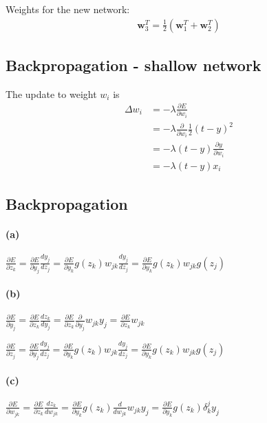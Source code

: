 \documentclass[a4paper,11pt]{article}
\begin{document}
	\noindent Weights for the new network:
	\begin{align*}
		\bm{w}_3^T=\frac{1}{2}(\bm{w}_1^T+\bm{w}_2^T)
	\end{align*}

	\subsection{Backpropagation - shallow network}
	The update to weight $w_i$ is
	\begin{align*}
		\Delta w_i &= -\lambda\frac{\partial E}{\partial w_i} \\
		&= -\lambda \frac{\partial}{\partial w_i}\frac{1}{2}(t-y)^2\\
		&= -\lambda (t-y)\frac{\partial y}{\partial w_i}\\
		&= -\lambda (t-y)x_i
	\end{align*}

	\subsection{Backpropagation}
	\paragraph{(a)}
	$\frac{\partial E}{\partial z_k} =\frac{\partial E}{\partial y_j} \frac{dy_j}{dz_j} = \frac{\partial E}{\partial y_k} g(z_k) w_{jk} \frac{dy_j}{dz_j} = \frac{\partial E}{\partial y_k} g(z_k) w_{jk} g(z_j)$
	\paragraph{(b)}
	$\frac{\partial E}{\partial y_j} =\frac{\partial E}{\partial z_k} \frac{dz_k}{dy_j} =
	\frac{\partial E}{\partial z_k} \frac{\partial}{\partial y_j} w_{jk} y_j =\frac{\partial E}{\partial z_k} w_{jk}$\par
	\setlength\parindent{1cm} $\frac{\partial E}{\partial z_j} = \frac{\partial E}{\partial y_j} \frac{dy_j}{dz_j} = \frac{\partial E}{\partial y_k} g(z_k) w_{jk} \frac{dy_j}{dz_j} = \frac{\partial E}{\partial y_k} g(z_k) w_{jk} g(z_j)$
	\paragraph{(c)}
	$\frac{\partial E}{\partial w_{jk}} = \frac{\partial E}{\partial z_k} \frac{dz_k}{dw_{jk}} = \frac{\partial E}{\partial y_k} g(z_k) \frac{d}{dw_{jk}} w_{jk}y_{j} = \frac{\partial E}{\partial y_k} g(z_k) \delta^j_k y_j$
\end{document}
